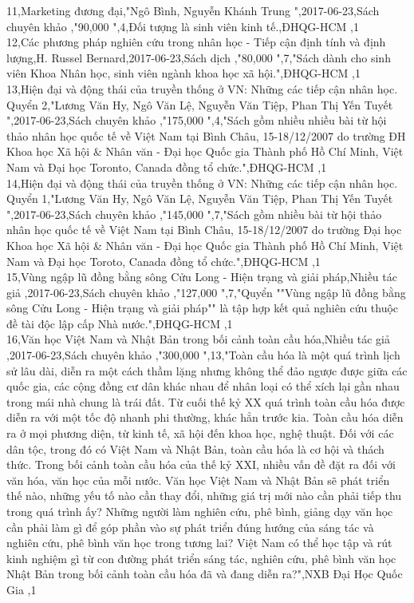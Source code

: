 \documentclass[a4paper]{article}
\begin{document}
11,Marketing đương đại,"Ngô Bình, Nguyễn Khánh Trung ",2017-06-23,Sách chuyên khảo ,"90,000 ",4,Đối tượng là sinh viên kinh tế.,ĐHQG-HCM ,1\\
12,Các phương pháp nghiên cứu trong nhân học - Tiếp cận định tính và định lượng,H. Russel Bernard,2017-06-23,Sách dịch ,"80,000 ",7,"Sách dành cho sinh viên Khoa Nhân học, sinh viên ngành khoa học xã hội.",ĐHQG-HCM ,1\\
13,Hiện đại và động thái của truyền thống ở VN: Những các tiếp cận nhân học. Quyển 2,"Lương Văn Hy, Ngô Văn Lệ, Nguyễn Văn Tiệp, Phan Thị Yến Tuyết ",2017-06-23,Sách chuyên khảo ,"175,000 ",4,"Sách gồm nhiều nhiều bài từ hội thảo nhân học quốc tế về Việt Nam tại Bình Châu, 15-18/12/2007 do trường ĐH Khoa học Xã hội \& Nhân văn - Đại học Quốc gia Thành  phố Hồ Chí Minh, Việt Nam và Đại học Toronto, Canada đồng tổ chức.",ĐHQG-HCM ,1\\
14,Hiện đại và động thái của truyền thống ở VN: Những các tiếp cận nhân học. Quyển 1,"Lương Văn Hy, Ngô Văn Lệ, Nguyễn Văn Tiệp, Phan Thị Yến Tuyết ",2017-06-23,Sách chuyên khảo ,"145,000 ",7,"Sách gồm nhiều bài từ hội thảo nhân học quốc tế về Việt Nam tại Bình Châu, 15-18/12/2007 do trường Đại học Khoa học Xã hội \& Nhân văn - Đại học Quốc gia Thành phố Hồ Chí Minh, Việt Nam và Đại học Toroto, Canada đồng tổ chức.",ĐHQG-HCM ,1\\
15,Vùng ngập lũ đồng bằng sông Cửu Long - Hiện trạng và giải pháp,Nhiều tác giả ,2017-06-23,Sách chuyên khảo ,"127,000 ",7,"Quyển ""Vùng ngập lũ đồng bằng sông Cửu Long - Hiện trạng và giải pháp"" là tập hợp kết quả nghiên cứu thuộc đề tài độc lập cấp Nhà nước.",ĐHQG-HCM ,1\\
16,Văn học Việt Nam và Nhật Bản trong bối cảnh toàn cầu hóa,Nhiều tác giả ,2017-06-23,Sách chuyên khảo ,"300,000 ",13,"Toàn cầu hóa là một quá trình lịch sử lâu dài, diễn ra một cách thầm lặng nhưng không thể đảo ngược được giữa các quốc gia, các cộng đồng cư dân khác nhau để nhân loại có thể xích lại gần nhau trong mái nhà chung là trái đất. Từ cuối thế kỷ XX quá trình toàn cầu hóa được diễn ra với một tốc độ nhanh phi thường, khác hẳn trước kia. Toàn cầu hóa diễn ra ở mọi phương diện, từ kinh tế, xã hội đến khoa học, nghệ thuật. Đối với các dân tộc, trong đó có Việt Nam và Nhật Bản, toàn cầu hóa là cơ hội và thách thức. Trong bối cảnh toàn cầu hóa của thế kỷ XXI, nhiều vấn đề đặt ra đối với văn hóa, văn học của mỗi nước. Văn học Việt Nam và Nhật Bản sẽ phát triển thế nào, những yếu tố nào cần thay đổi, những giá trị mới nào cần phải tiếp thu trong quá trình ấy? Những người làm nghiên cứu, phê bình, giảng dạy văn học cần phải làm gì để góp phần vào sự phát triển đúng hướng của sáng tác và nghiên cứu, phê bình văn học trong tương lai? Việt Nam có thể học tập và rút kinh nghiệm gì từ con đường phát triển sáng tác, nghiên cứu, phê bình văn học Nhật Bản trong bối cảnh toàn cầu hóa đã và đang diễn ra?",NXB Đại Học Quốc Gia ,1\\
\end{document}
